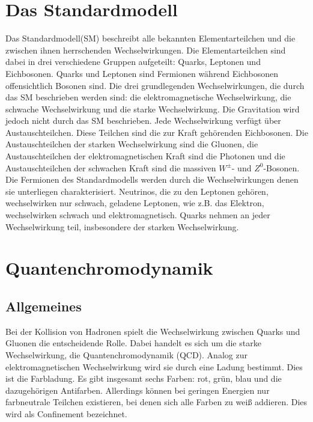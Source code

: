 \section{Das Standardmodell}
Das Standardmodell(SM) beschreibt alle bekannten Elementarteilchen und die zwischen ihnen herrschenden Wechselwirkungen. Die Elementarteilchen sind dabei in drei verschiedene Gruppen aufgeteilt: Quarks, Leptonen und Eichbosonen. Quarks und Leptonen sind Fermionen während Eichbosonen offensichtlich Bosonen sind. Die drei grundlegenden Wechselwirkungen, die durch das SM beschrieben werden sind: die elektromagnetische Wechselwirkung, die schwache Wechselwirkung und die starke Wechselwirkung. Die Gravitation wird jedoch nicht durch das SM beschrieben.
Jede Wechselwirkung verfügt über Austauschteilchen. Diese Teilchen sind die zur Kraft gehörenden Eichbosonen. Die Austauschteilchen der starken Wechselwirkung sind die Gluonen, die Austauschteilchen der elektromagnetischen Kraft sind die Photonen und die Austauschteilchen der schwachen Kraft sind die massiven $W^{\pm}$- und $Z^{0}$-Bosonen.
Die Fermionen des Standardmodells werden durch die Wechselwirkungen denen sie unterliegen charakterisiert. Neutrinos, die zu den Leptonen gehören, wechselwirken nur schwach, geladene Leptonen, wie z.B. das Elektron, wechselwirken schwach und elektromagnetisch. Quarks nehmen an jeder Wechselwirkung teil, insbesondere der starken Wechselwirkung\cite{halzen2008quark}.

\section{Quantenchromodynamik}
\subsection{Allgemeines}
Bei der Kollision von Hadronen spielt die Wechselwirkung zwischen Quarks und Gluonen die entscheidende Rolle. Dabei handelt es sich um die starke Wechselwirkung, die Quantenchromodynamik (QCD). Analog zur elektromagnetischen Wechselwirkung wird sie durch eine Ladung bestimmt. Dies ist die Farbladung. Es gibt insgesamt sechs Farben: rot, grün, blau und die dazugehörigen Antifarben. Allerdings können bei geringen Energien nur farbneutrale Teilchen existieren, bei denen sich alle Farben zu weiß addieren. Dies wird als Confinement bezeichnet\cite{halzen2008quark}.


